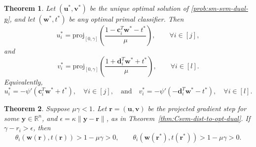 \documentclass[10pt,a4paper]{amsart}
\newtheorem{theorem}{Theorem}
\newcommand\proj{\mathrm{proj}}
\newcommand\w{\bm{w}}
\newcommand\y{\bm{y}}
\newcommand{\R}{{\mathbb{R}}} %
\renewcommand\r{\bm{r}}
\renewcommand\u{\bm{u}}
\renewcommand\v{\bm{v}}
\renewcommand{\c}{\bm{c}}
\renewcommand{\d}{\bm{d}}
\begin{document}
\begin{theorem} \label{thm:Csvm-dual-psi-relation}
Let $(\u^*,\v^*)$ be the unique optimal solution of \eqref{prob:sm-svm-dual-p}, and let $(\w^*,t^*)$ be any optimal primal classifier. Then
\[
    u_i^* = \proj_{[0,\gamma]}\left(\frac{1-\c_i^T\w^* - t^*}{\mu}\right),\qquad \forall i\in[j],
\]
and
\[
    v_i^* = \proj_{[0,\gamma]}\left(\frac{1+\d_i^T\w^* + t^*}{\mu}\right),\qquad \forall i\in[l].
\]
Equivalently,
\[
    u_i^* = -\psi'(\c_i^T\w^* + t^*),\quad\forall i \in [j],\quad\text{and}\quad v_i^* = -\psi'(-\d_i^T\w^* - t^*),\quad\forall i \in [l].
\]
\end{theorem}

\begin{theorem} \label{thm:Csvm-single-point-certificate}
Suppose $\mu\gamma<1$. Let $\r = (\u,\v)$ be the projected gradient step for some $\y \in \R^n$, and $\epsilon = \kappa \|\y - \r\|$, as in Theorem~\ref{thm:Csvm-dist-to-opt-dual}. If $\gamma-r_i>\epsilon$, then
\[
    \theta_i(\w(\r),t(\r)) > 1-\mu\gamma > 0, \qquad \theta_i(\w(\r^*),t(\r^*)) > 1-\mu\gamma>0.
\]
\end{theorem}
\end{document}
